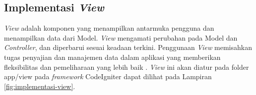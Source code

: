
\subsection{Implementasi \textit{View}}
\textit{View }adalah komponen yang menampilkan antarmuka pengguna dan menampilkan data dari Model. \textit{View} mengamati perubahan pada Model dan \textit{Controller}, dan diperbarui sesuai keadaan terkini. Penggunaan \textit{View} memisahkan tugas penyajian dan manajemen data dalam aplikasi yang memberikan fleksibilitas dan pemeliharaan yang lebih baik \cite{firdaus2020rancang}. \textit{View} ini akan diatur pada folder app/view pada \textit{framework} CodeIgniter dapat dilihat pada Lampiran \ref{fig:implementasi-view}.


